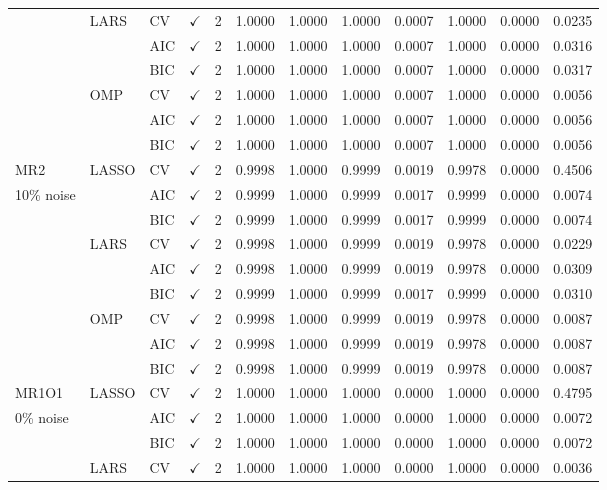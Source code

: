 \documentclass[11pt,a4paper]{article}
\begin{document}
{\begin{longtable}{@{}lllccccccccc@{}}
& LARS & CV & $\checkmark$ & 2 & 1.0000 & 1.0000 & 1.0000 & 0.0007 & 1.0000 & 0.0000 & 0.0235 \\
& & AIC & $\checkmark$ & 2 & 1.0000 & 1.0000 & 1.0000 & 0.0007 & 1.0000 & 0.0000 & 0.0316 \\
& & BIC & $\checkmark$ & 2 & 1.0000 & 1.0000 & 1.0000 & 0.0007 & 1.0000 & 0.0000 & 0.0317 \\
& OMP & CV & $\checkmark$ & 2 & 1.0000 & 1.0000 & 1.0000 & 0.0007 & 1.0000 & 0.0000 & 0.0056 \\
& & AIC & $\checkmark$ & 2 & 1.0000 & 1.0000 & 1.0000 & 0.0007 & 1.0000 & 0.0000 & 0.0056 \\
& & BIC & $\checkmark$ & 2 & 1.0000 & 1.0000 & 1.0000 & 0.0007 & 1.0000 & 0.0000 & 0.0056 \\ \midrule
MR2 & LASSO & CV & $\checkmark$ & 2 & 0.9998 & 1.0000 & 0.9999 & 0.0019 & 0.9978 & 0.0000 & 0.4506 \\
10\% noise & & AIC & $\checkmark$ & 2 & 0.9999 & 1.0000 & 0.9999 & 0.0017 & 0.9999 & 0.0000 & 0.0074 \\
& & BIC & $\checkmark$ & 2 & 0.9999 & 1.0000 & 0.9999 & 0.0017 & 0.9999 & 0.0000 & 0.0074 \\
& LARS & CV & $\checkmark$ & 2 & 0.9998 & 1.0000 & 0.9999 & 0.0019 & 0.9978 & 0.0000 & 0.0229 \\
& & AIC & $\checkmark$ & 2 & 0.9998 & 1.0000 & 0.9999 & 0.0019 & 0.9978 & 0.0000 & 0.0309 \\
& & BIC & $\checkmark$ & 2 & 0.9999 & 1.0000 & 0.9999 & 0.0017 & 0.9999 & 0.0000 & 0.0310 \\
& OMP & CV & $\checkmark$ & 2 & 0.9998 & 1.0000 & 0.9999 & 0.0019 & 0.9978 & 0.0000 & 0.0087 \\
& & AIC & $\checkmark$ & 2 & 0.9998 & 1.0000 & 0.9999 & 0.0019 & 0.9978 & 0.0000 & 0.0087 \\
& & BIC & $\checkmark$ & 2 & 0.9998 & 1.0000 & 0.9999 & 0.0019 & 0.9978 & 0.0000 & 0.0087 \\ \midrule
MR1O1 & LASSO & CV & $\checkmark$ & 2 & 1.0000 & 1.0000 & 1.0000 & 0.0000 & 1.0000 & 0.0000 & 0.4795 \\
0\% noise & & AIC & $\checkmark$ & 2 & 1.0000 & 1.0000 & 1.0000 & 0.0000 & 1.0000 & 0.0000 & 0.0072 \\
& & BIC & $\checkmark$ & 2 & 1.0000 & 1.0000 & 1.0000 & 0.0000 & 1.0000 & 0.0000 & 0.0072 \\
& LARS & CV & $\checkmark$ & 2 & 1.0000 & 1.0000 & 1.0000 & 0.0000 & 1.0000 & 0.0000 & 0.0036 \\

\end{longtable}}
\end{document}
